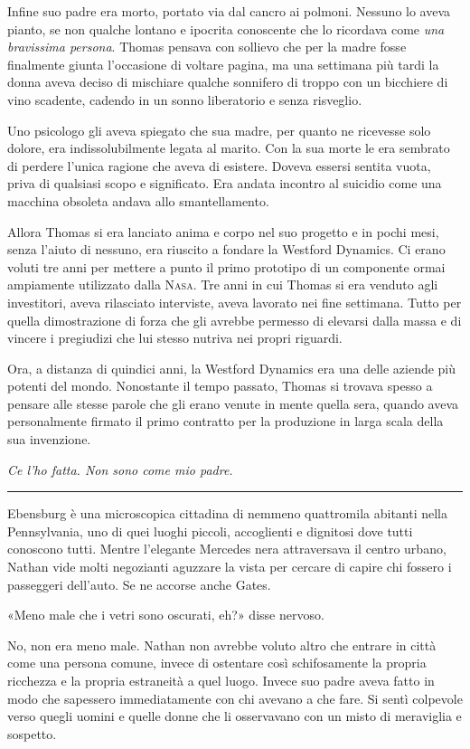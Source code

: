 \documentclass[a4paper,oneside,11pt]{memoir}
\begin{document}
Infine suo padre era morto, portato via dal cancro ai polmoni. Nessuno lo aveva pianto, se non qualche lontano e
ipocrita conoscente che lo ricordava come \emph{una bravissima persona}. Thomas pensava con sollievo che per la madre
fosse finalmente giunta l'occasione di voltare pagina, ma una settimana più tardi la donna aveva deciso di mischiare
qualche sonnifero di troppo con un bicchiere di vino scadente, cadendo in un sonno liberatorio e senza risveglio.

Uno psicologo gli aveva spiegato che sua madre, per quanto ne ricevesse solo dolore, era indissolubilmente legata al
marito. Con la sua morte le era sembrato di perdere l'unica ragione che aveva di esistere. Doveva essersi sentita vuota,
priva di qualsiasi scopo e significato. Era andata incontro al suicidio come una macchina obsoleta andava allo
smantellamento.

Allora Thomas si era lanciato anima e corpo nel suo progetto e in pochi mesi, senza l'aiuto di nessuno, era riuscito
a fondare la Westford Dynamics. Ci erano voluti tre anni per mettere a punto il primo prototipo di un componente ormai
ampiamente utilizzato dalla {\scshape Nasa}. Tre anni in cui Thomas si era venduto agli investitori, aveva rilasciato
interviste, aveva lavorato nei fine settimana. Tutto per quella dimostrazione di forza che gli avrebbe permesso di
elevarsi dalla massa e di vincere i pregiudizi che lui stesso nutriva nei propri riguardi.

Ora, a distanza di quindici anni, la Westford Dynamics era una delle aziende più potenti del mondo. Nonostante il tempo
passato, Thomas si trovava spesso a pensare alle stesse parole che gli erano venute in mente quella sera, quando aveva
personalmente firmato il primo contratto per la produzione in larga scala della sua invenzione.

\emph{Ce l'ho fatta. Non sono come mio padre.}

\plainbreak{1}

Ebensburg è una microscopica cittadina di nemmeno quattromila abitanti nella Pennsylvania, uno di quei luoghi piccoli,
accoglienti e dignitosi dove tutti conoscono tutti. Mentre l'elegante Mercedes nera attraversava il centro urbano,
Nathan vide molti negozianti aguzzare la vista per cercare di capire chi fossero i passeggeri dell'auto. Se ne accorse
anche Gates.

«Meno male che i vetri sono oscurati, eh?» disse nervoso.

No, non era meno male. Nathan non avrebbe voluto altro che entrare in città come una persona comune, invece di
ostentare così schifosamente la propria ricchezza e la propria estraneità a quel luogo. Invece suo padre aveva fatto
in modo che sapessero immediatamente con chi avevano a che fare. Si sentì colpevole verso quegli uomini e quelle donne
che li osservavano con un misto di meraviglia e sospetto.
\end{document}
